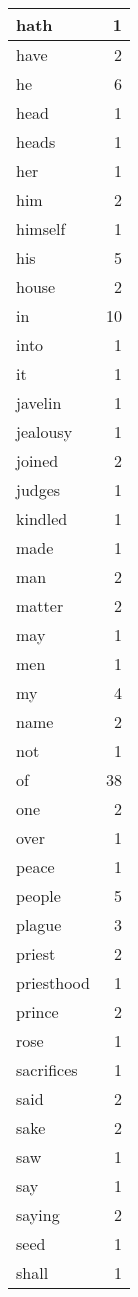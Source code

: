 \begin{center}
\begin{longtable}{l|r}
hath & 1\\ \hline 
have & 2\\ \hline 
he & 6\\ \hline 
head & 1\\ \hline 
heads & 1\\ \hline 
her & 1\\ \hline 
him & 2\\ \hline 
himself & 1\\ \hline 
his & 5\\ \hline 
house & 2\\ \hline 
in & 10\\ \hline 
into & 1\\ \hline 
it & 1\\ \hline 
javelin & 1\\ \hline 
jealousy & 1\\ \hline 
joined & 2\\ \hline 
judges & 1\\ \hline 
kindled & 1\\ \hline 
made & 1\\ \hline 
man & 2\\ \hline 
matter & 2\\ \hline 
may & 1\\ \hline 
men & 1\\ \hline 
my & 4\\ \hline 
name & 2\\ \hline 
not & 1\\ \hline 
of & 38\\ \hline 
one & 2\\ \hline 
over & 1\\ \hline 
peace & 1\\ \hline 
people & 5\\ \hline 
plague & 3\\ \hline 
priest & 2\\ \hline 
priesthood & 1\\ \hline 
prince & 2\\ \hline 
rose & 1\\ \hline 
sacrifices & 1\\ \hline 
said & 2\\ \hline 
sake & 2\\ \hline 
saw & 1\\ \hline 
say & 1\\ \hline 
saying & 2\\ \hline 
seed & 1\\ \hline 
shall & 1\\ \hline 

\end{longtable}
\end{center}
